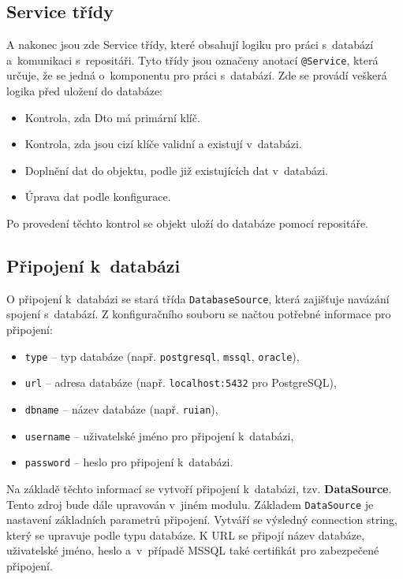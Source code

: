 \subsection{Service třídy}
\label{sec:serviceTridy}
A nakonec jsou zde Service třídy, které obsahují logiku pro práci s~databází a~komunikaci s~repositáři.
Tyto třídy jsou označeny anotací \texttt{@Service}, která určuje, že se jedná o~komponentu pro práci s~databází.
Zde se provádí veškerá logika před uložení do databáze:

\newpage

\begin{itemize}
    \item Kontrola, zda Dto má primární klíč.
    \item Kontrola, zda jsou cizí klíče validní a existují v~databázi.
    \item Doplnění dat do objektu, podle již existujících dat v~databázi.
    \item Úprava dat podle konfigurace.
\end{itemize}
Po provedení těchto kontrol se objekt uloží do databáze pomocí repositáře. 

\subsection{Připojení k~databázi}
O připojení k~databázi se stará třída \texttt{DatabaseSource}, která zajišťuje navázání spojení s~databází.  
Z konfiguračního souboru se načtou potřebné informace pro připojení:
\begin{itemize}
    \item \texttt{type} -- typ databáze (např. \texttt{postgresql}, \texttt{mssql}, \texttt{oracle}),
    \item \texttt{url} -- adresa databáze (např. \texttt{localhost:5432} pro PostgreSQL),
    \item \texttt{dbname} -- název databáze (např. \texttt{ruian}),
    \item \texttt{username} -- uživatelské jméno pro připojení k~databázi,
    \item \texttt{password} -- heslo pro připojení k~databázi.
\end{itemize}

Na základě těchto informací se vytvoří připojení k~databázi, tzv. \textbf{DataSource}.
Tento zdroj bude dále upravován v~jiném modulu.  
Základem \texttt{DataSource} je nastavení základních parametrů připojení.  
Vytváří se výsledný connection string, který se upravuje podle typu databáze.  
K URL se připojí název databáze, uživatelské jméno, heslo a~v~případě MSSQL také certifikát pro zabezpečené připojení.

